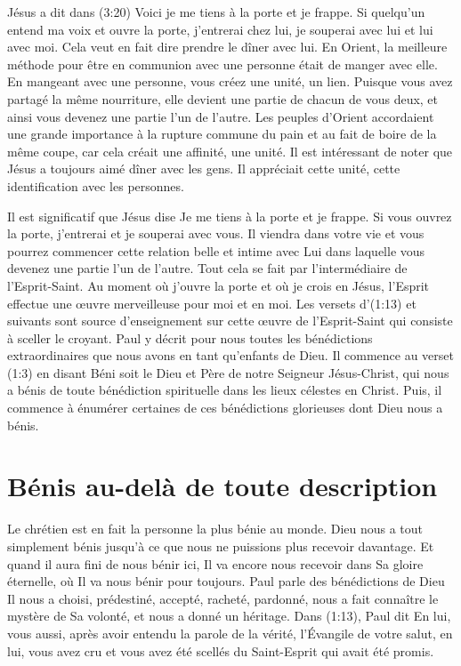 Jésus a dit dans (3:20)\frcolon{}
 \Og Voici\frcolon{} je me tiens à la porte et je frappe.
 Si quelqu'un entend ma voix et ouvre la porte,
 j'entrerai chez lui, je souperai avec lui et lui avec moi. \Fg{}
 Cela veut en fait dire\frcolon{} \Og prendre le dîner avec lui. \Fg{}
 En Orient, la meilleure méthode pour être en communion avec une personne
 était de manger avec elle. En mangeant avec une personne,
 vous créez une unité, un lien.
 Puisque vous avez partagé la même nourriture, elle devient une partie
 de chacun de vous deux, et ainsi vous devenez une partie l'un de l'autre.
 Les peuples d'Orient accordaient une grande importance à la rupture commune
 du pain et au fait de boire de la même coupe,
 car cela créait une affinité, une unité.
 Il est intéressant de noter que Jésus a toujours aimé dîner avec les gens.
 Il appréciait cette unité, cette identification avec les personnes.


Il est significatif que Jésus dise\frcolon{}
 \Og Je me tiens à la porte et je frappe.
 Si vous ouvrez la porte, j'entrerai et je souperai avec vous. \Fg{}
 Il viendra dans votre vie et vous pourrez commencer cette relation belle
 et intime avec Lui dans laquelle vous devenez une partie l'un de l'autre.
 Tout cela se fait par l'intermédiaire de l'Esprit-Saint.
 Au moment où j'ouvre la porte et où je crois en Jésus,
 l'Esprit effectue une œuvre merveilleuse pour moi et en moi.
 Les versets d'(1:13) et suivants sont source
 d'enseignement sur cette œuvre de l'Esprit-Saint
 qui consiste à sceller le croyant.
 Paul y décrit pour nous toutes les bénédictions extraordinaires
 que nous avons en tant qu'enfants de Dieu.
 Il commence au verset (1:3) en disant\frcolon{}
 \Og Béni soit le Dieu et Père de notre Seigneur Jésus-Christ,
 qui nous a bénis de toute bénédiction spirituelle
 dans les lieux célestes en Christ. \Fg{}
 Puis, il commence à énumérer certaines de ces bénédictions glorieuses
 dont Dieu nous a bénis.


\section{B\'enis au-del\`a de toute description}

Le chrétien est en fait la personne la plus bénie au monde.
 Dieu nous a tout simplement bénis jusqu'à ce que nous ne puissions plus
 recevoir davantage.
 Et quand il aura fini de nous bénir ici, Il va encore nous recevoir
 dans Sa gloire éternelle, où Il va nous bénir pour toujours.
 Paul parle des bénédictions de Dieu\frcolon{} Il nous a choisi, prédestiné,
 accepté, racheté, pardonné, nous a fait connaître
 le mystère de Sa volonté, et nous a donné un héritage.
 Dans (1:13), Paul dit\frcolon{}
 \Og En lui, vous aussi, après avoir entendu la parole de la vérité,
 l'Évangile de votre salut, en lui, vous avez cru et vous avez été scellés
 du Saint-Esprit qui avait été promis. \Fg{}

